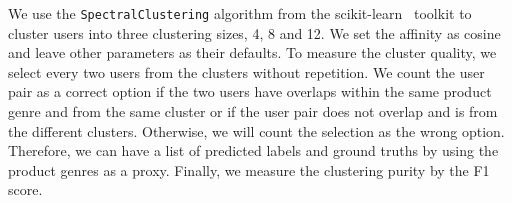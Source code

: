 \begin{table}[htp]
\centering
{}
\caption{Performance summary of different user embedding models. We report F1 scores at multiple numbers of clusters. The bold fonts indicate the best performance in each evaluation task.}
\label{chap4:tab:usereval}
\end{table}


We use the \texttt{SpectralClustering} algorithm from the scikit-learn~\cite{pedregosa2011scikit} toolkit to cluster users into three clustering sizes, 4, 8 and 12. 
We set the affinity as cosine and leave other parameters as their defaults.
To measure the cluster quality, we select every two users from the clusters without repetition.
We count the user pair as a correct option if the two users have overlaps within the same product genre and from the same cluster or if the user pair does not overlap and is from the different clusters.
Otherwise, we will count the selection as the wrong option.
Therefore, we can have a list of predicted labels and ground truths by using the product genres as a proxy.
Finally, we measure the clustering purity by the F1 score.

